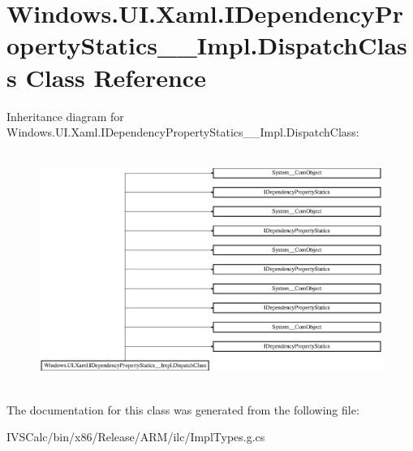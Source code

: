 \hypertarget{class_windows_1_1_u_i_1_1_xaml_1_1_i_dependency_property_statics_____impl_1_1_dispatch_class}{}\section{Windows.\+U\+I.\+Xaml.\+I\+Dependency\+Property\+Statics\+\_\+\+\_\+\+Impl.\+Dispatch\+Class Class Reference}
\label{class_windows_1_1_u_i_1_1_xaml_1_1_i_dependency_property_statics_____impl_1_1_dispatch_class}
Inheritance diagram for Windows.\+U\+I.\+Xaml.\+I\+Dependency\+Property\+Statics\+\_\+\+\_\+\+Impl.\+Dispatch\+Class\+:\begin{figure}[H]
\begin{center}
\leavevmode
\includegraphics[height=7.661692cm]{class_windows_1_1_u_i_1_1_xaml_1_1_i_dependency_property_statics_____impl_1_1_dispatch_class}
\end{center}
\end{figure}


The documentation for this class was generated from the following file\+:\begin{DoxyCompactItemize}
\item 
I\+V\+S\+Calc/bin/x86/\+Release/\+A\+R\+M/ilc/Impl\+Types.\+g.\+cs\end{DoxyCompactItemize}
